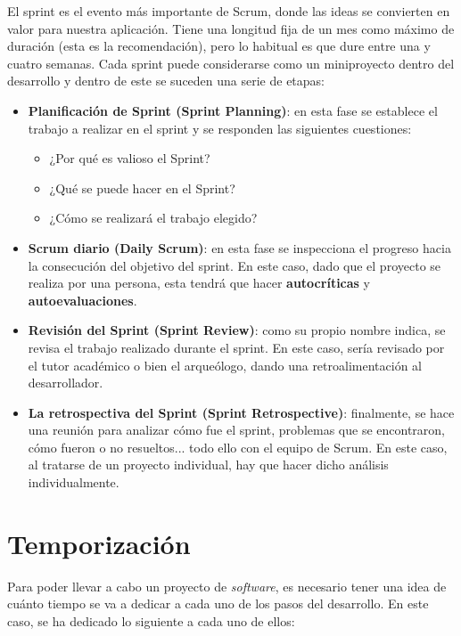 El sprint es el evento más importante de Scrum, donde las ideas se convierten en valor
para nuestra aplicación. Tiene una longitud fija de un mes como máximo de duración (esta
es la recomendación), pero lo habitual es que dure entre una y cuatro semanas. Cada sprint
puede considerarse como un miniproyecto dentro del desarrollo y dentro de este se suceden
una serie de etapas:

    \begin{itemize}
        \item \textbf{Planificación de Sprint (Sprint Planning)}: en esta fase se establece
        el trabajo a realizar en el sprint y se responden las siguientes cuestiones:
            \begin{itemize}
                \item ¿Por qué es valioso el Sprint?
                \item ¿Qué se puede hacer en el Sprint?
                \item ¿Cómo se realizará el trabajo elegido?
            \end{itemize}
        \item \textbf{Scrum diario (Daily Scrum)}: en esta fase se inspecciona el progreso
        hacia la consecución del objetivo del sprint. En este caso, dado que el proyecto
        se realiza por una persona, esta tendrá que hacer \textbf{autocríticas} y
        \textbf{autoevaluaciones}.
        \item \textbf{Revisión del Sprint (Sprint Review)}: como su propio nombre indica,
        se revisa el trabajo realizado durante el sprint. En este caso, sería revisado por
        el tutor académico o bien el arqueólogo, dando una retroalimentación al desarrollador.
        \item \textbf{La retrospectiva del Sprint (Sprint Retrospective)}: finalmente, se
        hace una reunión para analizar cómo fue el sprint, problemas que se encontraron,
        cómo fueron o no resueltos... todo ello con el equipo de Scrum. En este caso, al
        tratarse de un proyecto individual, hay que hacer dicho análisis individualmente. 
    \end{itemize}



\section{Temporización} \label{sec:timing}
Para poder llevar a cabo un proyecto de \textit{software}, es necesario tener una idea de cuánto
tiempo se va a dedicar a cada uno de los pasos del desarrollo. En este caso, se ha
dedicado lo siguiente a cada uno de ellos:

